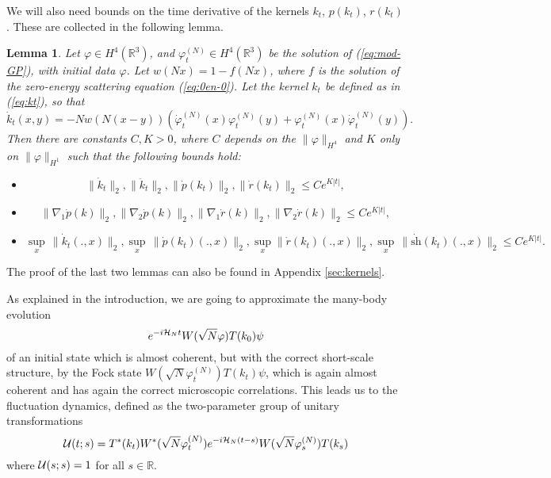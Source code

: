 \documentclass[11pt,a4paper]{article}
\newtheorem{lemma}[thm]{Lemma}
\newcommand{\cU}{{\cal U}}
\newcommand{\bR}{{\mathbb R}}
\newcommand{\cH}{{\cal H}}
\newcommand{\R}{\mathbb{R}}
\newcommand{\norm}[1]{\lVert#1\rVert}	%
\newcommand{\ph}{\varphi_t^{(N)}}	%
\begin{document}
We will also need bounds on the time derivative of the kernels $k_t$, $p(k_t)$, $r(k_t)$. These are collected in the following lemma.
\begin{lemma}\label{lm:dotk} 
Let $\varphi \in H^4(\R^3)$, and $\ph \in H^4 (\bR^3)$ be the solution of (\ref{eq:mod-GP}), with initial data $\varphi$. Let $w(Nx) = 1 - f(Nx)$, where $f$ is the solution of the zero-energy scattering equation (\ref{eq:0en-0}). Let the kernel $k_t$ be defined as in (\ref{eq:kt}), so that
\begin{equation}\label{eq:dtk} \dot{k}_t (x,y) = - N w (N (x-y)) \left( \dot{\varphi}_t^{(N)} (x) \varphi_t^{(N)} (y) + \varphi_t^{(N)} (x) \dot{\varphi}_t^{(N)} (y) \right). \end{equation}
Then there are constants $C,K >0$, where $C$ depends on the $\| \varphi \|_{H^4}$ and $K$ only on $\| \varphi \|_{H^1}$ such that the following bounds hold: 
\begin{itemize}
\item[(i)]   
 \[  \| \dot{k}_t \|_2 ,  \| \ddot k_t \|_2 , \| \dot{p} (k_t) \|_2 , \| \dot{r} (k_t) \|_2  \leq C e^{K|t|}, \]
\item[(ii)] 
\[ \| \nabla_1 \dot p (k) \|_2 ,  \| \nabla_2 \dot p (k) \|_2 , \| \nabla_1 \dot r (k) \|_2,  \| \nabla_2 \dot r (k) \|_2  \leq C  e^{K|t|}, \]
\item[(iii)] 
\[
\sup_x \, \norm{\dot k_t (., x)}_{2} ,  \sup_x \, \norm{\dot p (k_t) (., x)}_{2}, \sup_x \norm{\dot r (k_t) (., x)}_{2}, \sup_x \, \| \dot{\text{sh}} (k_t) (., x) \|_2  \leq C e^{K|t|}.
\] 
 \end{itemize}
 \end{lemma}
The proof of the last two lemmas can also be found in Appendix \ref{sec:kernels}. 

\medskip

As explained in the introduction, we are going to approximate the many-body evolution
\[ e^{-i \cH_N t} W(\sqrt{N} \varphi ) T(k_0) \psi \]
of an initial state which is almost coherent, but with the correct short-scale structure, by the Fock state $W(\sqrt{N} \varphi_t^{(N)}) T(k_t) \psi$, which is again almost coherent and has again the correct microscopic correlations. This leads us to the fluctuation dynamics, defined as the two-parameter group of unitary transformations 
\begin{equation}\label{eq:cU} \cU (t;s) = T^* (k_t) W^* (\sqrt{N} \varphi_t^{(N)}) e^{-i\cH_N (t-s)} W(\sqrt{N} \varphi_s^{(N)}) T(k_s) \end{equation}
where $\cU (s;s) = 1$ for all $s \in \bR$. 
\end{document}
